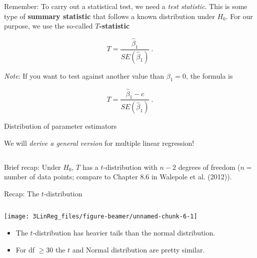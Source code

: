 \documentclass[10pt,ignorenonframetext,]{beamer}
\providecommand{\tightlist}{%
  \setlength{\itemsep}{0pt}\setlength{\parskip}{0pt}}
\begin{document}
\begin{frame}

Remember: To carry out a statistical test, we need a \emph{test
statistic}. This is some type of \textbf{summary statistic} that follows
a known distribution under \(H_0\). For our purpose, we use the
so-called \textbf{\(T\)-statistic}

\begin{equation*}
T=\frac{\hat\beta_1 }{SE(\hat\beta_1)}\ . 
\end{equation*}

\vspace{4mm}

\emph{Note}: If you want to test against another value than
\(\beta_1=0\), the formula is

\begin{equation*}
T=\frac{\hat\beta_1 - c}{SE(\hat\beta_1)} \ .
\end{equation*}

\end{frame}

\begin{frame}

\begin{block}{Distribution of parameter estimators}

\vspace{2mm}

We will \emph{derive a general version} for multiple linear regression!

\(~\)

Brief recap: Under \(H_0\), \(T\) has a \(t\)-distribution with \(n-2\)
degrees of freedom (\(n=\) number of data points; compare to Chapter 8.6
in Walepole et al. (2012)).

\end{block}

\end{frame}

\begin{frame}

\begin{block}{Recap: The \(t\)-distribution}

\(~\)

\begin{center}\texttt{[image: 3LinReg\_files/figure-beamer/unnamed-chunk-6-1]} \end{center}

\normalsize

\begin{itemize}
\tightlist
\item
  The \(t\)-distribution has heavier tails than the normal distribution.
\item
  For df \(\geq 30\) the \(t\) and Normal distribution are pretty
  similar.
\end{itemize}

\end{block}

\end{frame}
\end{document}
